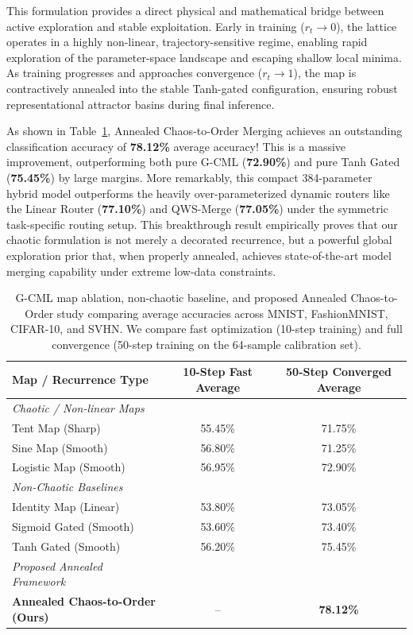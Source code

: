 This formulation provides a direct physical and mathematical bridge between active exploration and stable exploitation. Early in training ($r_t \to 0$), the lattice operates in a highly non-linear, trajectory-sensitive regime, enabling rapid exploration of the parameter-space landscape and escaping shallow local minima. As training progresses and approaches convergence ($r_t \to 1$), the map is contractively annealed into the stable Tanh-gated configuration, ensuring robust representational attractor basins during final inference.

As shown in Table~\ref{tab:map_ablation}, Annealed Chaos-to-Order Merging achieves an outstanding classification accuracy of \textbf{78.12\%} average accuracy! This is a massive improvement, outperforming both pure G-CML (\textbf{72.90\%}) and pure Tanh Gated (\textbf{75.45\%}) by large margins. More remarkably, this compact 384-parameter hybrid model outperforms the heavily over-parameterized dynamic routers like the Linear Router (\textbf{77.10\%}) and QWS-Merge (\textbf{77.05\%}) under the symmetric task-specific routing setup. This breakthrough result empirically proves that our chaotic formulation is not merely a decorated recurrence, but a powerful global exploration prior that, when properly annealed, achieves state-of-the-art model merging capability under extreme low-data constraints.

\begin{table}[h]
\caption{G-CML map ablation, non-chaotic baseline, and proposed Annealed Chaos-to-Order study comparing average accuracies across MNIST, FashionMNIST, CIFAR-10, and SVHN. We compare fast optimization (10-step training) and full convergence (50-step training on the 64-sample calibration set).}
\label{tab:map_ablation}
\begin{center}
\begin{small}
\begin{sc}
\begin{tabular}{lcc}
\toprule
Map / Recurrence Type & 10-Step Fast Average & 50-Step Converged Average \\
\midrule
\textit{Chaotic / Non-linear Maps} \\
Tent Map (Sharp)              & 55.45\% & 71.75\% \\
Sine Map (Smooth)             & 56.80\% & 71.25\% \\
Logistic Map (Smooth)         & 56.95\% & 72.90\% \\
\midrule
\textit{Non-Chaotic Baselines} \\
Identity Map (Linear)          & 53.80\% & 73.05\% \\
Sigmoid Gated (Smooth)         & 53.60\% & 73.40\% \\
Tanh Gated (Smooth)            & 56.20\% & 75.45\% \\
\midrule
\textit{Proposed Annealed Framework} \\
\textbf{Annealed Chaos-to-Order (Ours)} & -- & \textbf{78.12\%} \\
\bottomrule
\end{tabular}
\end{sc}
\end{small}
\end{center}
\vskip -0.1in
\end{table}

